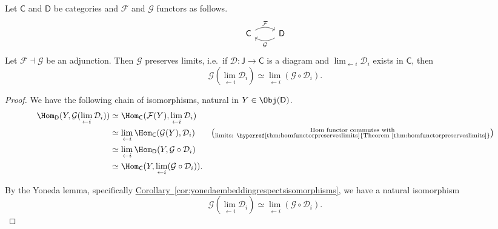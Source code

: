 \documentclass[notes.tex]{subfiles}
\begin{document}
\begin{theorem}
  \label{thm:rightadjointspreservelimits}
  Let $\mathsf{C}$ and $\mathsf{D}$ be categories and $\mathcal{F}$ and $\mathcal{G}$ functors as follows.
  \begin{equation*}
    \begin{tikzcd}
      \mathsf{C}
      \arrow[r, rightarrow, bend left, "\mathcal{F}"]
      & \mathsf{D}
      \arrow[l, rightarrow, bend left, "\mathcal{G}"]
    \end{tikzcd}
  \end{equation*}
  Let $\mathcal{F} \dashv \mathcal{G}$ be an adjunction. Then $\mathcal{G}$ preserves limits, i.e.\ if $\mathcal{D}\colon \mathsf{J} \to \mathsf{C}$ is a diagram and $\lim_{\leftarrow i}\mathcal{D}_{i}$ exists in $\mathsf{C}$, then
  \begin{equation*}
    \mathcal{G}(\lim_{\leftarrow i}\mathcal{D}_{i}) \simeq \lim_{\leftarrow i} (\mathcal{G} \circ \mathcal{D}_{i}).
  \end{equation*}
\end{theorem}
\begin{proof}
  We have the following chain of isomorphisms, natural in $Y \in \Obj(\mathsf{D})$.
  \begin{align*}
    \Hom_{\mathsf{D}}(Y, \mathcal{G}(\lim_{\leftarrow i}\mathcal{D}_{i})) &\simeq \Hom_{\mathsf{C}}(\mathcal{F}(Y), \lim_{\leftarrow i}\mathcal{D}_{i}) \\
    &\simeq \lim_{\leftarrow i} \Hom_{\mathsf{C}}(\mathcal{G}(Y), \mathcal{D}_{i}) &\left(\substack{\text{Hom functor commutes with} \\ \text{limits: \hyperref[thm:homfunctorpreserveslimits]{Theorem~\ref*{thm:homfunctorpreserveslimits}}}}\right) \\
    &\simeq \lim_{\leftarrow i} \Hom_{\mathsf{D}}(Y, \mathcal{G}\circ \mathcal{D}_{i}) \\
    &\simeq \Hom_{\mathsf{C}}(Y, \lim_{\leftarrow i}(\mathcal{G}\circ \mathcal{D}_{i})).
  \end{align*}

  By the Yoneda lemma, specifically \hyperref[cor:yonedaembeddingrespectsisomorphisms]{Corollary~\ref*{cor:yonedaembeddingrespectsisomorphisms}}, we have a natural isomorphism
  \begin{equation*}
    \mathcal{G}(\lim_{\leftarrow i}\mathcal{D}_{i}) \simeq \lim_{\leftarrow i}(\mathcal{G} \circ \mathcal{D}_{i}).
  \end{equation*}
\end{proof}
\end{document}
